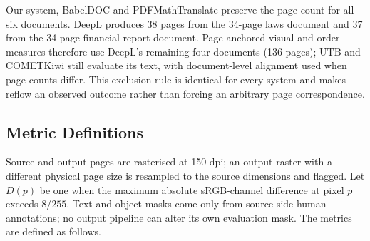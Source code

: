 Our system, BabelDOC and PDFMathTranslate preserve the page count for all six
documents. DeepL produces 38 pages from the 34-page laws document and 37 from
the 34-page financial-report document. Page-anchored visual and order measures
therefore use DeepL's remaining four documents (136 pages); UTB and COMETKiwi
still evaluate its text, with document-level alignment used when page counts
differ. This exclusion rule is identical for every system and makes reflow an
observed outcome rather than forcing an arbitrary page correspondence.

\subsection{Metric Definitions}

Source and output pages are rasterised at 150 dpi; an output raster with a
different physical page size is resampled to the source dimensions and flagged.
Let $D(p)$ be one when the
maximum absolute sRGB-channel difference at pixel $p$ exceeds $8/255$. Text and
object masks come only from source-side human annotations; no output pipeline can
alter its own evaluation mask. The metrics are defined as follows.

